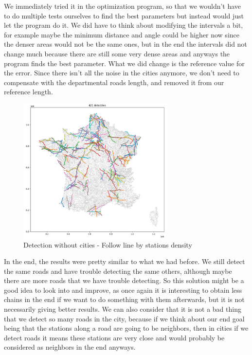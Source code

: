 \documentclass[main.tex]{subfiles}
\begin{document}
We immediately tried it in the optimization program, so that we wouldn't have to do multiple tests ourselves to find the best parameters but instead would just let the program do it. We did have to think about modifying the intervals a bit, for example maybe the minimum distance and angle could be higher now since the denser areas would not be the same ones, but in the end the intervals did not change much because there are still some very dense areas and anyways the program finds the best parameter. What we did change is the reference value for the error. Since there isn't all the noise in the cities anymore, we don't need to compensate with the departmental roads length, and removed it from our reference length.

\begin{figure}[H]
    \centering
    \includegraphics[width=0.7\textwidth]{Images/Res_Sansvilles.png}
    \caption{Detection without cities - Follow line by stations density}
\end{figure}

In the end, the results were pretty similar to what we had before. We still detect the same roads and have trouble detecting the same others, although maybe there are more roads that we have trouble detecting. So this solution might be a good idea to look into and improve, as once again it is interesting to obtain less chains in the end if we want to do something with them afterwards, but it is not necessarily giving better results. We can also consider that it is not a bad thing that we detect so many roads in the city, because if we think about our end goal being that the stations along a road are going to be neighbors, then in cities if we detect roads it means these stations are very close and would probably be considered as neighbors in the end anyways. 
\end{document}
